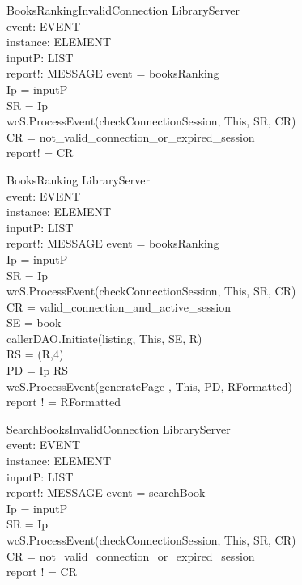 \begin{schema}{BooksRankingInvalidConnection}
\Xi LibraryServer \\
event: EVENT \\
instance: ELEMENT \\
inputP: LIST \\
report!: MESSAGE
\where event = booksRanking \\
Ip = \head inputP \\
SR = \lseq Ip \rseq \\ 
wcS.ProcessEvent(checkConnectionSession, This, SR, CR) \\
CR = not\_valid\_connection\_or\_expired\_session \\ 
report! = CR 
\end{schema}

\begin{schema}{BooksRanking}
\Xi LibraryServer \\
event: EVENT \\
instance: ELEMENT \\
inputP: LIST \\
report!: MESSAGE
\where event = booksRanking \\
Ip = \head inputP \\
SR = \lseq Ip \rseq \\ 
wcS.ProcessEvent(checkConnectionSession, This, SR, CR) \\
CR = valid\_connection\_and\_active\_session \\
SE = \lseq book \rseq \\
callerDAO.Initiate(listing, This, SE, R) \\
RS = \sort(R,4) \\ 
PD = \lseq Ip RS \rseq \\
wcS.ProcessEvent(generatePage , This, PD, RFormatted) \\
report ! = RFormatted
\end{schema}

\begin{schema}{SearchBooksInvalidConnection}
\Xi LibraryServer \\
event: EVENT \\
instance: ELEMENT \\
inputP: LIST \\
report!: MESSAGE
\where event = searchBook \\
Ip = \head inputP \\
SR = \lseq Ip \rseq \\ 
wcS.ProcessEvent(checkConnectionSession, This, SR, CR) \\
CR = not\_valid\_connection\_or\_expired\_session \\ 
report ! = CR
\end{schema}

